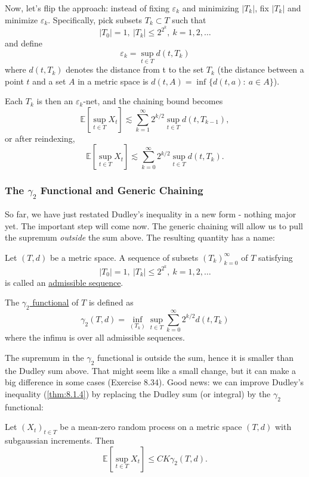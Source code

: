 Now, let's flip the approach: instead of fixing $\varepsilon_k$ and minimizing $|T_k|$, fix $|T_k|$ and 
minimize $\varepsilon_k$. Specifically, pick subsets $T_k \subset T$ such that 
\[ |T_0| = 1, \ |T_k| \leq 2^{2^k}, \ k = 1, 2, \dots \]
and define 
\[ \varepsilon_k = \sup_{t \in T} d(t, T_k) \]
where $d(t, T_k)$ denotes the distance from t to the set $T_k$ (the distance between a point $t$ and a set $A$ 
in a metric space is $d(t, A) = \inf_{} \{ d(t, a): \ a \in A \}$).

Each $T_k$ is then an $\varepsilon_k$-net, and the chaining bound becomes 
\[ \mathbb{E}\left[ \sup_{t \in T}X_t \right] \lesssim \sum_{k = 1}^{\infty} 2^{k/2} \sup_{t \in T} 
d(t, T_{k - 1}), \]
or after reindexing, 
\[ \mathbb{E}\left[ \sup_{t \in T}X_t \right] \lesssim \sum_{k = 0}^{\infty} 2^{k/2} \sup_{t \in T} d(t, T_k). \]


\subsubsection{The \texorpdfstring{$\gamma_2$}{} Functional and Generic Chaining}
So far, we have just restated Dudley's inequality in a new form - nothing major yet. The important step will 
come now. The generic chaining will allow us to pull the supremum \textit{outside} the sum above. The resulting 
quantity has a name:

\begin{definition}[]
\label{def:8.5.1}
Let $(T, d)$ be a metric space. A sequence of subsets $(T_k)_{k = 0}^{\infty}$ of $T$ satisfying 
\[ |T_0| = 1, \ |T_k| \leq 2^{2^k}, \ k = 1, 2, \dots \]
is called an \underline{admissible sequence}.

The \underline{$\gamma_2$ functional} of $T$ is defined as 
\[ \gamma_2(T, d) = \inf_{(T_k)} \sup_{t \in T} \sum_{k = 0}^{\infty} 2^{k / 2} d(t, T_k) \]
where the infimu is over all admissible sequences.
\end{definition}

The supremum in the $\gamma_2$ functional is outside the sum, hence it is smaller than the Dudley sum above. 
That might seem like a small change, but it can make a big difference in some cases (Exercise 8.34). Good news: 
we can improve Dudley's inequality (\cref{thm:8.1.4}) by replacing the Dudley sum (or integral) by the 
$\gamma_2$ functional:

\begin{theorem}
\label{thm:8.5.2}
Let $(X_t)_{t \in T}$ be a mean-zero random process on a metric space $(T, d)$ with subgaussian increments. Then 
\[ \mathbb{E}\left[ \sup_{t \in T}X_t \right] \leq CK \gamma_2(T, d). \]
\end{theorem}

